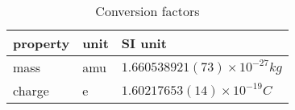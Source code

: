\documentclass[10pt,conference,onecolumn]{IEEEtran}
\begin{document}
\begin{table}[htbp]
 \centering	  	  
 \caption{Conversion factors}
\label{tab:conversion}
\begin{tabular}{l|l|l}
\hline \hline
\textbf{property} & \textbf{unit} & \textbf{SI unit} \\
\hline
mass & amu & $1.660538921(73) \times 10^{ - 27} kg$ \\
charge & e   & $1.60217653(14) \times 10^{ - 19} C$ \\
\hline \hline
\end{tabular}
\end{table}



\end{document}
